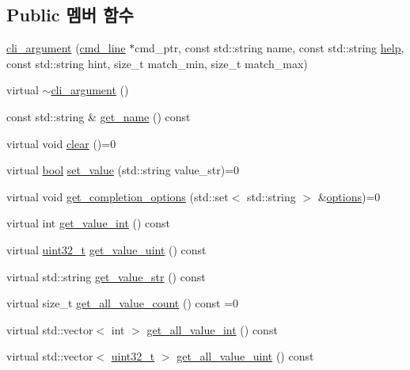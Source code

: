 \subsection*{Public 멤버 함수}
\begin{DoxyCompactItemize}
\item 
\hyperlink{classcli__argument_ade1913cb71efc5989a46ea5fafacf4b4}{cli\+\_\+argument} (\hyperlink{classcmd__line}{cmd\+\_\+line} $\ast$cmd\+\_\+ptr, const std\+::string name, const std\+::string \hyperlink{simple__rx_8c_ad8c51bbfda76f19f61c727838e6eee30}{help}, const std\+::string hint, size\+\_\+t match\+\_\+min, size\+\_\+t match\+\_\+max)
\item 
virtual \hyperlink{classcli__argument_a245765bd7f6e6785249900b82cb6d8fb}{$\sim$cli\+\_\+argument} ()
\item 
const std\+::string \& \hyperlink{classcli__argument_a5d21f54a56044f0fd7b2d9bb0474ba33}{get\+\_\+name} () const 
\item 
virtual void \hyperlink{classcli__argument_a5eeb94d22b8366d1b68d0614384802fe}{clear} ()=0
\item 
virtual \hyperlink{avb__gptp_8h_af6a258d8f3ee5206d682d799316314b1}{bool} \hyperlink{classcli__argument_a3fca6420b74bdd67ab37a11d86868800}{set\+\_\+value} (std\+::string value\+\_\+str)=0
\item 
virtual void \hyperlink{classcli__argument_a989163af46d0a4949c15cc8f8f15251c}{get\+\_\+completion\+\_\+options} (std\+::set$<$ std\+::string $>$ \&\hyperlink{aaf-talker_8c_abc1fd3a47aea6a8944038c9100eb9135}{options})=0
\item 
virtual int \hyperlink{classcli__argument_a70de7682629678e3139c0511910036c1}{get\+\_\+value\+\_\+int} () const 
\item 
virtual \hyperlink{parse_8c_a6eb1e68cc391dd753bc8ce896dbb8315}{uint32\+\_\+t} \hyperlink{classcli__argument_a5f9326ccc460c0477c9ec2a3c6fe8e2b}{get\+\_\+value\+\_\+uint} () const 
\item 
virtual std\+::string \hyperlink{classcli__argument_a30924e54bc1df74cadc22e90d43c0124}{get\+\_\+value\+\_\+str} () const 
\item 
virtual size\+\_\+t \hyperlink{classcli__argument_adc4b9c88fb5ff61fa9c4ddb6f2faf3c8}{get\+\_\+all\+\_\+value\+\_\+count} () const =0
\item 
virtual std\+::vector$<$ int $>$ \hyperlink{classcli__argument_a714bede99fe9cb950c3c93e81cb96074}{get\+\_\+all\+\_\+value\+\_\+int} () const 
\item 
virtual std\+::vector$<$ \hyperlink{parse_8c_a6eb1e68cc391dd753bc8ce896dbb8315}{uint32\+\_\+t} $>$ \hyperlink{classcli__argument_a2636ddb80a5e6d770a9928181926cfe2}{get\+\_\+all\+\_\+value\+\_\+uint} () const 

\end{DoxyCompactItemize}
